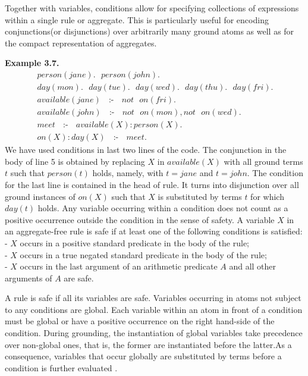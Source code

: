 \documentclass[14pt,a4paper, titlepage]{article}
\DeclareMathOperator{\leftimpl}{:-}
\begin{document}
Together  with variables, conditions allow for specifying collections of expressions within a single rule or aggregate. This is particularly useful for encoding conjunctions(or disjunctions) over arbitrarily many ground atoms as well as for the compact representation of aggregates. 

\textbf{Example 3.7.}
\begin{align*}
& \mathit{person}(\mathit{jane}). \text{ } \mathit{person}(\mathit{john}).\\
& \mathit{day}(\mathit{mon}). \text{ } \mathit{day}(\mathit{tue}). \text{ } \mathit{day}(\mathit{wed}). \text{ } \mathit{day}(\mathit{thu}). \text{ } \mathit{day}(\mathit{fri}). \text{ }\\
& \mathit{available}(\mathit{jane}) \text{ } \leftimpl \text{ } not \text{ } \mathit{on}(\mathit{fri}).\\
& \mathit{available}(\mathit{john})\text{ } \leftimpl \text{ } \mathit{not} \text{ } \mathit{on}(\mathit{mon}), \mathit{not}  \text{ } \mathit{on}(\mathit{wed}).\\
& \mathit{meet} \text{ } \leftimpl \text{ } \mathit{available}(X) : \mathit{person}(X).\\
& \mathit{on}(X) : \mathit{day}(X) \text{ } \leftimpl \text{ } \mathit{meet}.
\end{align*}  
We have used conditions in last two lines of the code. The conjunction in the body of line 5 is obtained by replacing $X$ in $\mathit{available(X)}$ with all ground terms $t$ such that $\mathit{person(t)}$ holds, namely, with $\mathit{t=jane}$ and $\mathit{t=john}$. The condition for the last line is contained in the head of rule. It turns into disjunction over all ground instances of $\mathit{on(X)}$ such that $X$ is substituted by terms $t$ for which $\mathit{day(t)}$ holds. Any variable occurring within a condition does not count as a positive occurrence outside the condition in the sense of safety. A variable $X$ in an aggregate-free rule is safe if at least one of the following conditions is satisfied:\\- $X$ occurs in a positive standard predicate in the body of the rule;\\- $X$ occurs in a true negated standard predicate in the body of the rule;\\- $X$ occurs in the last argument of an arithmetic predicate $A$ and all other arguments of $A$ are safe.

A rule is safe if all its variables are safe. Variables occurring in atoms not subject to any conditions are global. Each variable within an atom in front of a condition must be global or have a positive occurrence on the right hand-side of the condition. During grounding, the instantiation of global variables take precedence over non-global ones, that is, the former are instantiated before the latter.As a consequence, variables that occur globally are substituted by terms before a condition is further evaluated \cite{pott}.    
\end{document}
